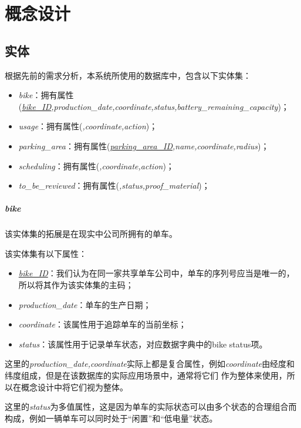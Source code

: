 \chapter{概念设计}
\thispagestyle{empty}
\section{实体}
根据先前的需求分析，本系统所使用的数据库中，包含以下实体集：
\begin{itemize}
  \item \textit{bike}：拥有属性(\textit{\underline{bike\_ID},production\_date,coordinate,status,battery\_remaining\_capacity})；
  \item \textit{usage}：拥有属性(\textit{,coordinate,action})；
  \item \textit{parking\_area}：拥有属性(\textit{\underline{parking\_area\_ID},name,coordinate,radius})；
  \item \textit{scheduling}：拥有属性(\textit{,coordinate,action})；
  \item \textit{to\_be\_reviewed}：拥有属性(\textit{,status,proof\_material})；
\end{itemize}

\paragraph{\textit{bike}}

该实体集的拓展是在现实中公司所拥有的单车。

该实体集有以下属性：
\begin{itemize}
  \item \textit{\underline{bike\_ID}}：我们认为在同一家共享单车公司中，单车的序列号应当是唯一的，所以将其作为该实体集的主码；
  \item \textit{production\_date}：单车的生产日期；
  \item \textit{coordinate}：该属性用于追踪单车的当前坐标；
  \item \textit{status}：该属性用于记录单车状态，对应数据字典中的bike status项。
\end{itemize}

这里的\textit{production\_date,coordinate}实际上都是复合属性，例如\textit{coordinate}由经度和纬度组成，但是在该数据库的实际应用场景中，通常将它们
作为整体来使用，所以在概念设计中将它们视为整体。

这里的\textit{status}为多值属性，这是因为单车的实际状态可以由多个状态的合理组合而构成，例如一辆单车可以同时处于“闲置”和“低电量”状态。
